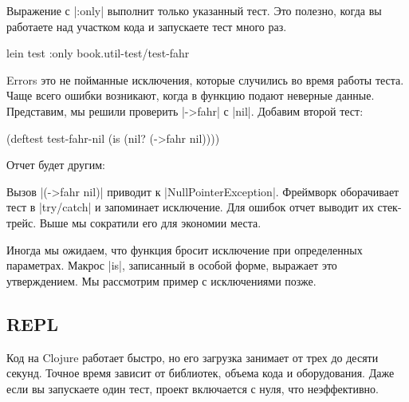 Выражение с \spverb|:only| выполнит только указанный тест. Это полезно, когда вы
работаете над участком кода и запускаете тест много раз.

\begin{english}
  \begin{bash}
lein test :only book.util-test/test-fahr
  \end{bash}
\end{english}

Errors это не пойманные исключения, которые случились во время работы
теста. Чаще всего ошибки возникают, когда в функцию подают неверные
данные. Представим, мы решили проверить \spverb|->fahr| с \spverb|nil|. Добавим
второй тест:

\begin{english}
  \begin{clojure}
(deftest test-fahr-nil
  (is (nil? (->fahr nil))))
  \end{clojure}
\end{english}

Отчет будет другим:

\begin{english}
\end{english}

Вызов \spverb|(->fahr nil)| приводит к \spverb|NullPointerException|. Фреймворк
оборачивает тест в \spverb|try/catch| и запоминает исключение. Для ошибок отчет
выводит их стек-трейс. Выше мы сократили его для экономии места.

Иногда мы ожидаем, что функция бросит исключение при определенных
параметрах. Макрос \spverb|is|, записанный в особой форме, выражает это
утверждением. Мы рассмотрим пример с исключениями позже.

\subsection{REPL}

Код на Clojure работает быстро, но его загрузка занимает от трех до десяти
секунд. Точное время зависит от библиотек, объема кода и оборудования. Даже если
вы запускаете один тест, проект включается с нуля, что неэффективно.

